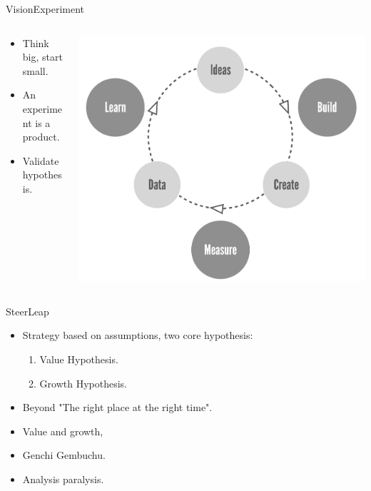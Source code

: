 \documentclass[aspectratio=169]{beamer}
\begin{document}
\begin{frame}{Vision}{Experiment}
  \begin{columns}
    \begin{column}{0.5\textwidth}
  \begin{itemize}
      \item Think big, start small.
      \item An experiment is a product.
      \item Validate hypothesis.
  \end{itemize}
      \end{column}
\begin{column}{0.5\textwidth}  %
   \begin{center}
     \includegraphics[scale=0.20]{build-measure-learn}
      \end{center}
\end{column}
  \end{columns}
\end{frame}


\begin{frame}{Steer}{Leap}
  \begin{itemize}
    \item Strategy based on assumptions, two core hypothesis:
      \begin{enumerate}
        \item Value Hypothesis.
        \item Growth Hypothesis.
      \end{enumerate}

    \item Beyond "The right place at the right time".
    \item Value and growth,
    \item Genchi Gembuchu.
    \item Analysis paralysis.
  \end{itemize}
\end{frame}
\end{document}
